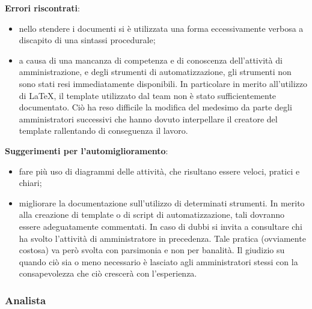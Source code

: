 \begin{description}
	\item \textbf{Errori riscontrati}:
		\begin{itemize}
			\item nello stendere i documenti si è utilizzata una forma eccessivamente verbosa a discapito di una sintassi procedurale;
			\item a causa di una mancanza di competenza e di conoscenza dell'attività di amministrazione, e degli strumenti di automatizzazione, gli strumenti non sono stati resi immediatamente disponibili. In particolare in merito all'utilizzo di \LaTeX, il template utilizzato dal team non è stato sufficientemente documentato. Ciò ha reso difficile la modifica del medesimo da parte degli amministratori successivi che hanno dovuto interpellare il creatore del template rallentando di conseguenza il lavoro.
		\end{itemize}
	\item \textbf{Suggerimenti per l'automiglioramento}:
		\begin{itemize}
			\item fare più uso di diagrammi delle attività, che risultano essere veloci, pratici e chiari;
			\item migliorare la documentazione sull'utilizzo di determinati strumenti. In merito alla creazione di template o di script di automatizzazione, tali dovranno essere adeguatamente commentati. 
In caso di dubbi si invita a consultare chi ha svolto l'attività di amministratore in precedenza. Tale pratica (ovviamente costosa) va però svolta con parsimonia e non per banalità. Il giudizio su quando ciò sia o meno necessario è lasciato agli amministratori stessi con la consapevolezza che ciò crescerà con l'esperienza.		
		\end{itemize}
\end{description}

\subsubsection{Analista}

